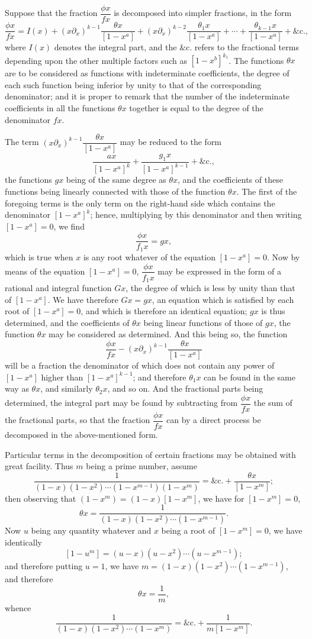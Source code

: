 \documentclass[11pt]{article}
\begin{document}
Suppose that the fraction $\dfrac{\phi x}{f x}$ is decomposed into simpler fractions, in the form
\[
\frac{\phi x}{f x} = I(x) + (x \partial_x)^{k-1}\frac{\theta x}{[1-x^a]} + (x \partial_x)^{k-2}\frac{\theta_1 x}{[1-x^a]} + \cdots + \frac{\theta_{k-1} x}{[1-x^a]} + \&\text{c.},
\]
where $I(x)$ denotes the integral part, and the $\&\text{c.}$ refers to the fractional terms depending upon the other multiple factors such as $[1-x^b]^{k_1}$. The functions $\theta x$ are to be considered as functions with indeterminate coefficients, the degree of each such function being inferior by unity to that of the corresponding denominator; and it is proper to remark that the number of the indeterminate coefficients in all the functions $\theta x$ together is equal to the degree of the denominator $f x$.

The term $(x \partial_x)^{k-1}\dfrac{\theta x}{[1-x^a]}$ may be reduced to the form
\[
\frac{a x}{[1-x^a]^k} + \frac{g_1 x}{[1-x^a]^{k-1}} + \&\text{c.},
\]
the functions $g x$ being of the same degree as $\theta x$, and the coefficients of these functions being linearly connected with those of the function $\theta x$. The first of the foregoing terms is the only term on the right-hand side which contains the denominator $[1-x^a]^k$; hence, multiplying by this denominator and then writing $[1-x^a]=0$, we find
\[
\frac{\phi x}{f_1 x} = g x,
\]
which is true when $x$ is any root whatever of the equation $[1-x^a]=0$. Now by means of the equation $[1-x^a]=0$, $\dfrac{\phi x}{f_1 x}$ may be expressed in the form of a rational and integral function $G x$, the degree of which is less by unity than that of $[1-x^a]$. We have therefore $G x = g x$, an equation which is satisfied by each root of $[1-x^a]=0$, and which is therefore an identical equation; $g x$ is thus determined, and the coefficients of $\theta x$ being linear functions of those of $g x$, the function $\theta x$ may be considered as determined. And this being so, the function
\[
\frac{\phi x}{f x} - (x \partial_x)^{k-1}\frac{\theta x}{[1-x^a]}
\]
will be a fraction the denominator of which does not contain any power of $[1-x^a]$ higher than $[1-x^a]^{k-1}$; and therefore $\theta_1 x$ can be found in the same way as $\theta x$, and similarly $\theta_2 x$, and so on. And the fractional parts being determined, the integral part may be found by subtracting from $\dfrac{\phi x}{f x}$ the sum of the fractional parts, so that the fraction $\dfrac{\phi x}{f x}$ can by a direct process be decomposed in the above-mentioned form.

Particular terms in the decomposition of certain fractions may be obtained with great facility. Thus $m$ being a prime number, assume
\[
\frac{1}{(1-x)(1-x^2)\cdots(1-x^{m-1})(1-x^m)} = \&\text{c.} + \frac{\theta x}{[1-x^m]};
\]
then observing that $(1-x^m) = (1-x)[1-x^m]$, we have for $[1-x^m]=0$,
\[
\theta x = \frac{1}{(1-x)(1-x^2)\cdots(1-x^{m-1})}.
\]
Now $u$ being any quantity whatever and $x$ being a root of $[1-x^m]=0$, we have identically
\[
[1-u^m] = (u-x)(u-x^2)\cdots(u-x^{m-1});
\]
and therefore putting $u=1$, we have $m = (1-x)(1-x^2)\cdots(1-x^{m-1})$, and therefore
\[
\theta x = \frac{1}{m},
\]
whence
\[
\frac{1}{(1-x)(1-x^2)\cdots(1-x^m)} = \&\text{c.} + \frac{1}{m[1-x^m]}.
\]
\end{document}
